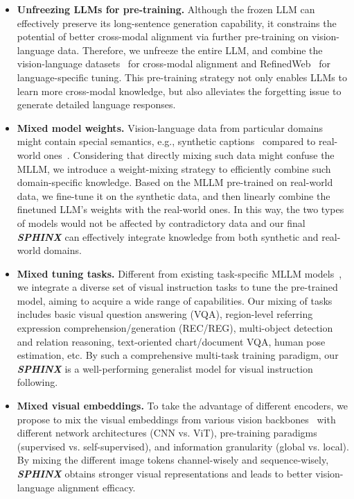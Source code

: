 \documentclass{article} \usepackage{iclr2024_conference,times}
\begin{document}
\begin{itemize}
    \item \textbf{Unfreezing LLMs for pre-training.}
    Although the frozen LLM can effectively preserve its long-sentence generation capability, it constrains the potential of better cross-modal alignment via further pre-training on vision-language data. Therefore, we unfreeze the entire LLM, and combine the vision-language datasets~\citep{schuhmann2021laion} for cross-modal alignment and RefinedWeb~\citep{Penedo2023TheRD} for language-specific tuning. This pre-training strategy not only enables LLMs to learn more cross-modal knowledge, but also alleviates the forgetting issue to generate detailed language responses.
    
    \item \textbf{Mixed model weights.}
    Vision-language data from particular domains might contain special semantics, e.g., synthetic captions~\citep{laioncoco} compared to real-world ones~\citep{schuhmann2021laion}. Considering that directly mixing such data might confuse the MLLM, we introduce a weight-mixing strategy to efficiently combine such domain-specific knowledge. Based on the MLLM pre-trained on real-world data, we fine-tune it on the synthetic data, and then linearly combine the finetuned LLM's weights with the real-world ones. In this way, the two types of models would not be affected by contradictory data and our final \textcolor{Goldenrod3}{\textbf{\textit{SPHINX}}} can effectively integrate knowledge from both synthetic and real-world domains.

   \item \textbf{Mixed tuning tasks.} Different from existing task-specific MLLM models~\citep{ye2023mplug,peng2023kosmos,chen2023shikra,llava,gao2023llama}, we integrate a diverse set of visual instruction tasks to tune the pre-trained model, aiming to acquire a wide range of capabilities.
   Our mixing of tasks includes basic visual question answering (VQA), region-level referring expression comprehension/generation (REC/REG), multi-object detection and relation reasoning, text-oriented chart/document VQA, human pose estimation, etc. By such a comprehensive multi-task training paradigm, our \textcolor{Goldenrod3}{\textbf{\textit{SPHINX}}} is a well-performing generalist model for visual instruction following.
   
   \item \textbf{Mixed visual embeddings.} To take the advantage of different encoders, we propose to mix the visual embeddings from various vision backbones~\citep{oquab2023dinov2,li2023blip,radford2021learning} with different network architectures (CNN vs. ViT), pre-training paradigms (supervised vs. self-supervised), and information granularity (global vs. local). By mixing the different image tokens channel-wisely and sequence-wisely, \textcolor{Goldenrod3}{\textbf{\textit{SPHINX}}} obtains stronger visual representations and leads to better vision-language alignment efficacy.

\end{itemize} 
\end{document}
